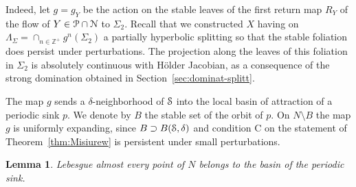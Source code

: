 \documentclass[reqno,12pt,a4paper]{amsart}
\theoremstyle{plain}
\newtheorem{lemma}[theorem]{Lemma}
\theoremstyle{definition}
\begin{document}
Indeed, let $g=g_Y$ be the action on the stable leaves of
the first return map $R_Y$ of the flow of $Y\in{\EuScript{P}}\cap{\EuScript{N}}$
to $\Sigma_2$. Recall that we constructed $X$ having on
$\Lambda_\Sigma=\cap_{n\in{{\mathbb Z}}^+}g^n(\Sigma_2)$ a partially
hyperbolic splitting so that the stable foliation does
persist under perturbations.  The projection along the
leaves of this foliation in $\Sigma_2$ is absolutely
continuous with H\"older Jacobian, as a consequence of the
strong domination obtained in
Section~\ref{sec:dominat-splitt}.

The map $g$ sends a $\delta$-neighborhood of ${\EuScript{S}}$ into the
local basin of attraction of a periodic sink $p$. We denote
by $B$ the stable set of the orbit of $p$. On $N\setminus B$
the map $g$ is uniformly expanding, since $B\supset
B({\EuScript{S}},\delta)$ and condition C on the statement of
Theorem~\ref{thm:Misiurew} is persistent under small
perturbations.

\begin{lemma}
  \label{le:fullbasinsink}
  Lebesgue almost every point of $N$ belongs to the basin of
  the periodic sink.
\end{lemma}
\end{document}
